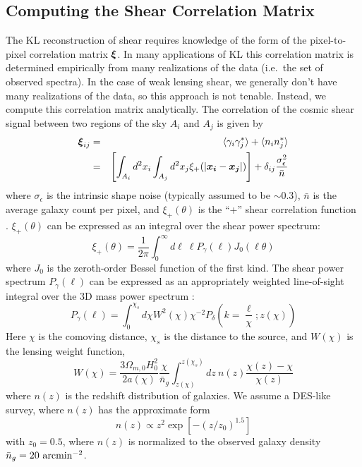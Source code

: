 \subsection{Computing the Shear Correlation Matrix}
\label{Shear_Correlation}
The KL reconstruction of shear requires knowledge of the
form of the pixel-to-pixel correlation matrix $\boldsymbol{\xi}$.  
In many applications of KL
\citep[e.g.~analysis of galaxy spectra,][]{Connolly95} 
this correlation matrix is
determined empirically from many realizations of the data (i.e.~the set
of observed spectra).  In the case of weak lensing shear, we generally
don't have many realizations of the data, so this approach is not
tenable.  Instead, we compute this correlation matrix analytically.  The 
correlation of the cosmic shear signal between two regions of the sky
$A_i$ and $A_j$ is given by
\begin{eqnarray}
  \label{xi_analytic}
  \boldsymbol{\xi}_{ij} 
  &=& \langle\gamma_i\gamma_j^*\rangle + 
  \langle n_in_j^*\rangle\nonumber\\
  &=& \left[\int_{A_i}d^2x_i\int_{A_j}d^2x_j 
    \xi_+(|\boldsymbol{x_i}-\boldsymbol{x_j}|)\right]
  + \delta_{ij}\frac{\sigma_\epsilon^2}{\bar{n}}
\end{eqnarray}
where $\sigma_\epsilon$ is the intrinsic shape noise (typically assumed to 
be $\sim 0.3$), $\bar{n}$ is the average galaxy count per pixel, and 
$\xi_+(\theta)$ is the ``+'' shear correlation function \citep{Schneider02}. 
$\xi_+(\theta)$ can be expressed as an integral over the shear power spectrum:
\begin{equation}
  \label{xi_plus_def}
  \xi_+(\theta) 
  = \frac{1}{2\pi} \int_0^\infty d\ell\ \ell P_\gamma(\ell) J_0(\ell\theta)
\end{equation}
where $J_0$ is the zeroth-order Bessel function of the first kind.  The 
shear power spectrum $P_\gamma(\ell)$ can be expressed as an 
appropriately weighted line-of-sight integral over the 3D mass power 
spectrum \citep[see, e.g.][]{Takada04}:
\begin{equation}
  \label{P_gamma}
  P_\gamma(\ell) = \int_0^{\chi_s}d\chi W^2(\chi)\chi^{-2}
  P_\delta\left(k=\frac{\ell}{\chi};z(\chi)\right)
\end{equation}
Here $\chi$ is the comoving distance, $\chi_s$ is the distance to the
source, and $W(\chi)$ is the lensing weight function,
\begin{equation}
  \label{Lensing_Weight}
  W(\chi) = \frac{3\Omega_{m,0}H_0^2}{2a(\chi)}\frac{\chi}{\bar{n}_g}
  \int_{z(\chi)}^{z(\chi_s)}dz\ n(z) \frac{\chi(z)-\chi}{\chi(z)}
\end{equation}
where $n(z)$ is the redshift distribution of galaxies.  We assume a
DES-like survey, where $n(z)$ has the approximate form
\begin{equation}
  \label{Number_Distribution}
  n(z) \propto z^2 \exp[-(z/z_0)^{1.5}]
\end{equation}
with $z_0 = 0.5$, where $n(z)$ is normalized to the observed galaxy density
$\bar{n}_g = 20\ {\rm arcmin}^{-2}$.


